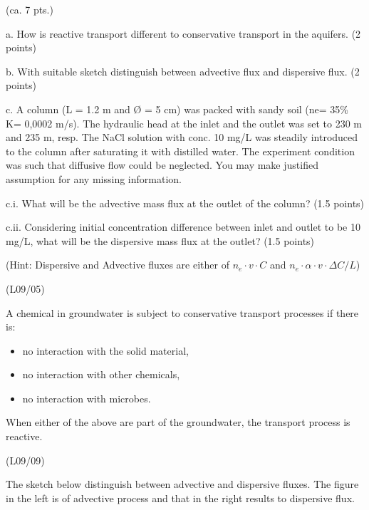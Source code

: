 \documentclass[letterpaper,10pt,english]{sphinxmanual}
\begin{document}
  (ca. 7 pts.)

a. How is reactive transport different to conservative transport in the aquifers. (2 points)

b. With suitable sketch distinguish between advective flux and dispersive flux. (2 points)

c. A column (L = 1.2 m and Ø = 5 cm) was packed with sandy soil (ne= 35\%  K= 0,0002 m/s). The hydraulic head at the inlet and the outlet was set to 230 m and 235 m, resp. The NaCl solution with conc. 10 mg/L was steadily introduced to the column after saturating it with distilled water. The experiment condition was such that diffusive flow could be neglected.  You may make justified assumption for any missing information.

c.i. What will be the advective mass flux at the outlet of the column? (1.5 points)

c.ii. Considering initial concentration difference between inlet and outlet to be 10 mg/L, what    will be the dispersive mass flux at the outlet? (1.5 points)

(Hint: Dispersive and Advective fluxes are either of \( n_e \cdot v\cdot C\) and \(n_e\cdot \alpha \cdot v \cdot \Delta C/L\))

 (L09/05)

A chemical in groundwater is subject to conservative transport processes if there is:
\begin{itemize}
\item {} 
no interaction with the solid material,

\item {} 
no interaction with other chemicals,

\item {} 
no interaction with microbes.

\end{itemize}

When either of the above are part of the groundwater, the transport process is reactive.

 (L09/09)

The sketch below distinguish between advective and dispersive fluxes. The figure in the left is of advective process and that in the right results to dispersive flux.

\noindent{}
\end{document}

